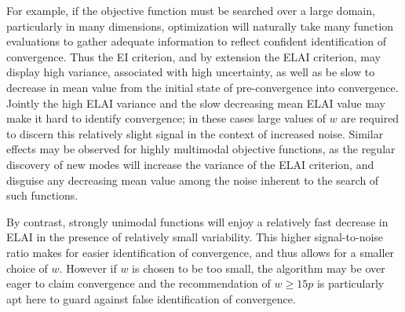\documentclass[12pt]{article}
\begin{document}
%
For example, if the objective function must be searched over a large domain, particularly in many dimensions, optimization will naturally take many function evaluations to gather adequate information to reflect confident identification of convergence.
%
Thus the EI criterion, and by extension the ELAI criterion, may display high variance, associated with high uncertainty, as well as be slow to decrease in mean value from the initial state of pre-convergence into convergence.
%
Jointly the high ELAI variance and the slow decreasing mean ELAI value may make it hard to identify convergence; in these cases large values of $w$ are required to discern this relatively slight signal in the context of increased noise.
%
Similar effects may be observed for highly multimodal objective functions, as the regular discovery of new modes will increase the variance of the ELAI criterion, and disguise any decreasing mean value among the noise inherent to the search of such functions.

%
%
% 
%
%

%
By contrast, strongly unimodal functions will enjoy a relatively fast decrease in ELAI in the presence of relatively small variability.
%
This higher signal-to-noise ratio makes for easier identification of convergence, and thus allows for a smaller choice of $w$. %
%
However if $w$ is chosen to be too small, the algorithm may be over eager to claim convergence and the recommendation of $w\ge15p$ is particularly apt here to guard against false identification of convergence.   

%
%
\end{document}
